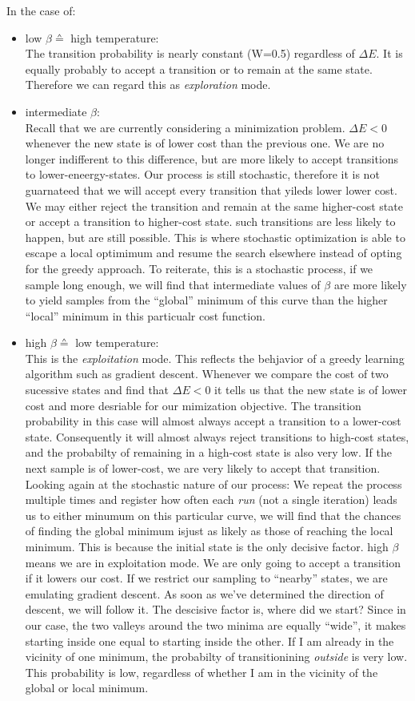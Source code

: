 In the case of:

\begin{itemize}
\item low $\beta \corresponds$ high temperature:\\
The transition probability is nearly constant (W=0.5) regardless of $\Delta E$. It is equally probably to accept a transition or to remain at the same state. Therefore we can regard this as \emph{exploration} mode.
\item intermediate $\beta$:\\
Recall that we are currently considering a minimization problem. $\Delta E < 0$ whenever the new state is of lower cost than the previous one. We are no longer indifferent to this difference, but are more likely to accept transitions to lower-eneergy-states. Our process is still stochastic, therefore it is not guarnateed that we will accept every transition that yileds lower lower cost. We may either reject the transition and remain at the same higher-cost state or accept a transition to higher-cost state. such transitions are less likely to happen, but are still possible. This is where stochastic optimization is able to escape a local optimimum and resume the search elsewhere instead of opting for the greedy approach. To reiterate, this is a stochastic process, if we sample long enough, we will find that intermediate values of $\beta$ are more likely to yield samples from the ``global'' minimum of this curve than the higher ``local'' minimum in this particualr cost function.
\item high $\beta \corresponds$ low temperature:\\
This is the \emph{exploitation} mode. This reflects the behjavior of a greedy learning algorithm such as gradient descent. Whenever we compare the cost of two sucessive states and find that $\Delta E < 0$ it tells us that the new state is of lower cost and more desriable for our mimization objective. The transition probability in this case will almost always accept a transition to a lower-cost state. Consequently it will almost always reject transitions to high-cost states, and the probabilty of remaining in a high-cost state is also very low. If the next sample is of lower-cost, we are very likely to accept that transition. Looking again at the stochastic nature of our process: We repeat the process multiple times and register how often each \emph{run} (not a single iteration) leads us to either minumum on this particular curve, we will find that the chances of finding the global minimum isjust as likely as those of reaching the local minimum. This is because the initial state is the only decisive factor. high $\beta$ means we are in exploitation mode. We are only going to accept a transition if it lowers our cost. If we restrict our sampling to ``nearby'' states, we are emulating gradient descent. As soon as we've determined the direction of descent, we will follow it. The descisive factor is, where did we start? Since in our case, the two valleys around the two minima are equally ``wide'', it makes starting inside one equal to starting inside the other. If I am already in the vicinity of one minimum, the probabilty of transitionining \emph{outside} is very low. This probability is low, regardless of whether I am in the vicinity of the global or local minimum.

\end{itemize}
